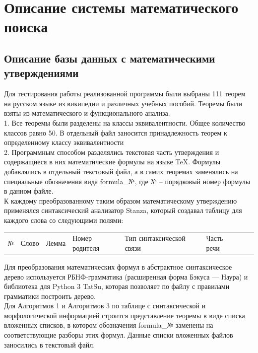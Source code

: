 \documentclass[12pt]{article}
\begin{document}
\section{Описание системы математического поиска}
\subsection{Описание базы данных с математическими утверждениями}
Для тестирования работы реализованной программы были выбраны 111 теорем на русском языке из википедии и различных учебных пособий. Теоремы были взяты из математического и функционального анализа. \\

1. Все теоремы были разделены на классы эквивалентности. Общее количество классов равно 50. В отдельный файл заносится принадлежность теорем к определенному классу эквивалентности\\

2. Программным способом разделялись текстовая часть утверждения и содержащиеся в них математические формулы на языке TeX. Формулы добавлялись в отдельный текстовый файл, а в самих теоремах заменялись на специальные обозначения вида formula\_№, где № --  порядковый номер формулы в данном файле.\\

К каждому преобразованному таким образом математическому утверждению применялся синтаксический анализатор Stanza, который создавал таблицу для каждого слова со следующими полями:

\begin{table}[h!]
\begin{tabular}{ l l l l l l l l }
№ & Слово & Лемма & Номер родителя & Тип синтаксической связи & Часть речи \\
\end{tabular}
\end{table} 

Для преобразования математических формул в абстрактное синтаксическое дерево используется РБНФ-грамматика (расширенная форма Бэкуса — Наура) и библиотека для Python 3 TatSu, которая позволяет по файлу с правилами грамматики построить дерево. \\

Для Алгоритмов 1 и Алгоритмов 3 по таблице с синтаксической и морфологической информацией строится представление теоремы в виде списка вложенных списков, в котором обозначения formula\_№ заменены на соответствующие разборы этих формул. Данные списки вложенных файлов заносились в текстовый файл. 
\end{document}
